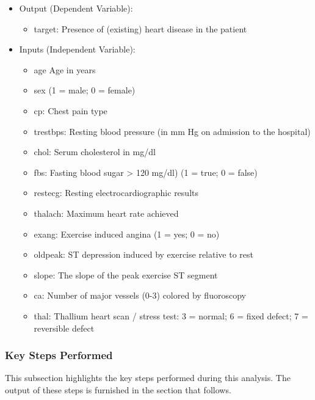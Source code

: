 \documentclass[]{article}
\providecommand{\tightlist}{%
  \setlength{\itemsep}{0pt}\setlength{\parskip}{0pt}}
\begin{document}
\begin{itemize}
\tightlist
\item
  Output (Dependent Variable):

  \begin{itemize}
  \tightlist
  \item
    target: Presence of (existing) heart disease in the patient
  \end{itemize}
\item
  Inputs (Independent Variable):

  \begin{itemize}
  \tightlist
  \item
    age \textbar{} Age in years
  \item
    sex \textbar{} (1 = male; 0 = female)
  \item
    cp: Chest pain type
  \item
    trestbps: Resting blood pressure (in mm Hg on admission to the
    hospital)
  \item
    chol: Serum cholesterol in mg/dl
  \item
    fbs: Fasting blood sugar \textgreater{} 120 mg/dl) (1 = true; 0 =
    false)
  \item
    restecg: Resting electrocardiographic results
  \item
    thalach: Maximum heart rate achieved
  \item
    exang: Exercise induced angina (1 = yes; 0 = no)
  \item
    oldpeak: ST depression induced by exercise relative to rest
  \item
    slope: The slope of the peak exercise ST segment
  \item
    ca: Number of major vessels (0-3) colored by fluoroscopy
  \item
    thal: Thallium heart scan / stress test: 3 = normal; 6 = fixed
    defect; 7 = reversible defect
  \end{itemize}
\end{itemize}

\subsubsection{Key Steps Performed}\label{key-steps-performed}

This subsection highlights the key steps performed during this analysis.
The output of these steps is furnished in the section that follows.
\end{document}
